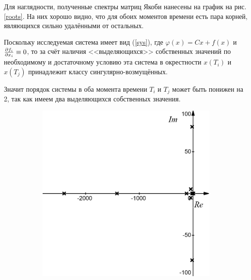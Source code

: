 	Для наглядности, полученные спектры матриц Якоби нанесены на график на рис. \ref{roots}. На них хорошо видно, что для обоих моментов времени есть пара корней, являющихся сильно удалёнными от остальных. 
	
	Поскольку исследуемая система имеет вид (\ref{sys}), где $\varphi(x) = Cx + f(x)$ и $\pdv{f_i}{x_i} \equiv 0$, то за счёт наличия <<выделяющихся>> собственных значений по необходимому и достаточному условию эта система в окрестности $x(T_i)$ и $x(T_j)$ принадлежит классу сингулярно-возмущённых.
	
	Значит порядок системы в оба момента времени $T_i$ и $T_j$ может быть понижен на 2, так как имеем два выделяющихся собственных значения.
	
	\begin{figure}[!h]
	 	\begin{subfigure}{.5\textwidth}
	 		\centering\includegraphics[width=.95\textwidth]{png/roots1.png}
	 		\caption{}
	 	\end{subfigure}
	 	\begin{subfigure}{.5\textwidth}

\end{subfigure}
\end{figure}
